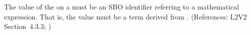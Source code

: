 The value of the   on a \FunctionDefinition must be an
SBO identifier referring to a mathematical expression.  That is, the value
must be a term derived from \sbomathformula.  (References: L2V2 Section~4.3.3;
)
